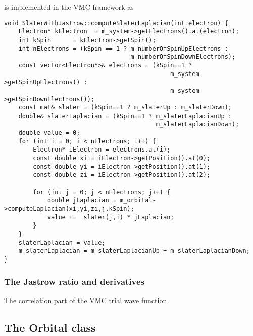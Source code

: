 \documentclass[../../master.tex]{subfiles}
\begin{document}
 is implemented in the VMC framework as
\begin{lstlisting}[language={[std]c++}]
void SlaterWithJastrow::computeSlaterLaplacian(int electron) {
    Electron* kElectron  = m_system->getElectrons().at(electron);
    int kSpin      = kElectron->getSpin();
    int nElectrons = (kSpin == 1 ? m_numberOfSpinUpElectrons :
                                   m_numberOfSpinDownElectrons);
    const vector<Electron*>& electrons = (kSpin==1 ?
                                              m_system->getSpinUpElectrons() :
                                              m_system->getSpinDownElectrons());
    const mat& slater = (kSpin==1 ? m_slaterUp : m_slaterDown);
    double& slaterLaplacian = (kSpin==1 ? m_slaterLaplacianUp :
                                          m_slaterLaplacianDown);
    double value = 0;
    for (int i = 0; i < nElectrons; i++) {
        Electron* iElectron = electrons.at(i);
        const double xi = iElectron->getPosition().at(0);
        const double yi = iElectron->getPosition().at(1);
        const double zi = iElectron->getPosition().at(2);

        for (int j = 0; j < nElectrons; j++) {
            double jLaplacian = m_orbital->computeLaplacian(xi,yi,zi,j,kSpin);
            value +=  slater(j,i) * jLaplacian;
        }
    }
    slaterLaplacian = value;
    m_slaterLaplacian = m_slaterLaplacianUp + m_slaterLaplacianDown;
}
\end{lstlisting}

\subsubsection{The Jastrow ratio and derivatives}
The correlation part of the VMC trial wave function 



\subsection{The Orbital class \label{orbital}}
\end{document}

